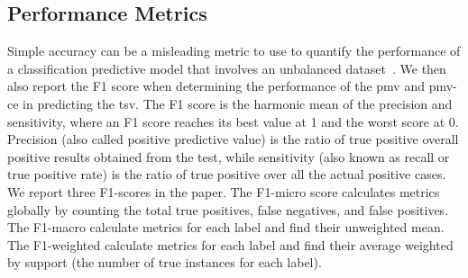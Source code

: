 %

\subsection{Performance Metrics}\label{subsec:performance-metrics}
Simple accuracy can be a misleading metric to use to quantify the performance of a classification predictive model that involves an unbalanced dataset~\cite{Chawla2005}.
We then also report the F1 score when determining the performance of the \ac{pmv} and \ac{pmv-ce} in predicting the \ac{tsv}.
The F1 score is the harmonic mean of the precision and sensitivity, where an F1 score reaches its best value at 1 and the worst score at 0.
Precision (also called positive predictive value) is the ratio of true positive overall positive results obtained from the test, while sensitivity (also known as recall or true positive rate) is the ratio of true positive over all the actual positive cases.
We report three F1-scores in the paper.
The F1-micro score calculates metrics globally by counting the total true positives, false negatives, and false positives.
The F1-macro calculate metrics for each label and find their unweighted mean.
The F1-weighted calculate metrics for each label and find their average weighted by support (the number of true instances for each label).